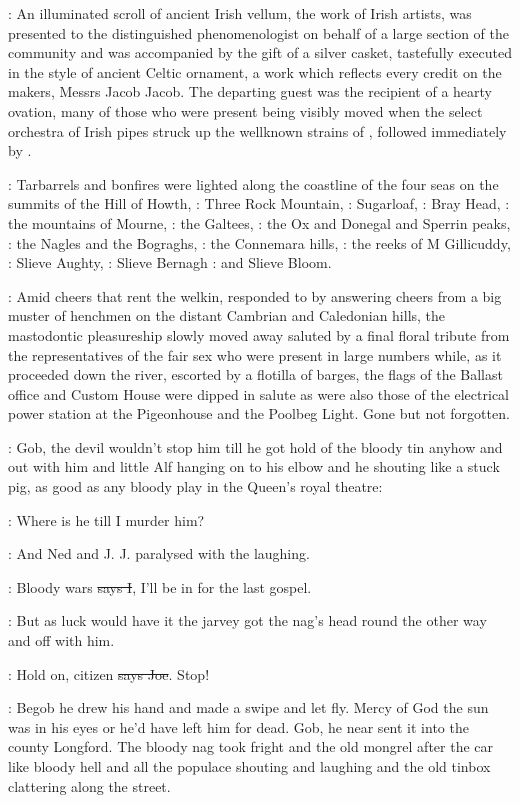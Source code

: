 :
An illuminated scroll of
ancient Irish vellum, the work of Irish artists, was presented to the
distinguished phenomenologist on behalf of a large section of the
community and was accompanied by the gift of a silver casket, tastefully
executed in the style of ancient Celtic ornament, a work which reflects
every credit on the makers, Messrs Jacob  Jacob. The departing guest
was the recipient of a hearty ovation, many of those who were present
being visibly moved when the select orchestra of Irish pipes struck up the
wellknown strains of ,
followed immediately by .

:
Tarbarrels and bonfires were lighted along the coastline
of the four seas on the summits of
the Hill of Howth,
:
Three Rock Mountain,
:
Sugarloaf,
:
Bray Head,
:
the mountains of Mourne,
:
the Galtees,
:
the Ox and Donegal and Sperrin peaks,
:
the Nagles and the Bograghs,
:
the Connemara hills,
:
the reeks of M Gillicuddy,
:
Slieve Aughty,
:
Slieve Bernagh
:
and Slieve Bloom.

:
Amid cheers that rent the welkin, responded to by answering cheers from a big
muster of henchmen on the distant Cambrian and Caledonian hills, the
mastodontic pleasureship slowly moved away saluted by a final floral
tribute from the representatives of the fair sex who were present in large
numbers while, as it proceeded down the river, escorted by a flotilla of
barges, the flags of the Ballast office and Custom House were dipped in
salute as were also those of the electrical power station at the
Pigeonhouse and the Poolbeg Light.  Gone but not forgotten.

\Nq:
Gob, the devil wouldn't stop him till he got hold of the bloody tin
anyhow and out with him and little Alf hanging on to his elbow and he
shouting like a stuck pig, as good as any bloody play in the Queen's royal
theatre:

\citizen:
Where is he till I murder him?

\Nq:
And Ned and J. J. paralysed with the laughing.

:
Bloody wars \sout{says I},
I'll be in for the last gospel.

\Nq:
But as luck would have it the jarvey got the nag's head round the
other way and off with him.

\joe:
Hold on, citizen \sout{says Joe}. Stop!

\Nq:
Begob he drew his hand and made a swipe and let fly. Mercy of God the sun
was in his eyes or he'd have left him for dead. Gob, he near sent it
into the county Longford. The bloody nag took fright and the old mongrel
after the car like bloody hell and all the populace shouting and laughing
and the old tinbox clattering along the street.

